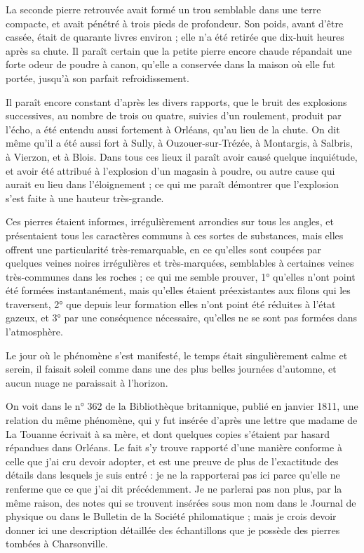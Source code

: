 \documentclass[a4paper, 12pt, oneside, french]{article}
\begin{document}
La seconde pierre retrouvée avait formé un trou semblable dans une terre compacte, et avait pénétré à trois pieds de profondeur. Son poids, avant d'être cassée, était de quarante livres environ ; elle n'a été retirée que dix-huit heures après sa chute. Il paraît certain que la petite pierre encore chaude répandait une forte odeur de poudre à canon, qu'elle a conservée dans la maison où elle fut portée, jusqu'à son parfait refroidissement.

Il paraît encore constant d'après les divers rapports, que le bruit des explosions successives, au nombre de trois ou quatre, suivies d'un roulement, produit par l'écho, a été entendu aussi fortement à Orléans, qu'au lieu de la chute. On dit même qu'il a été aussi fort à Sully, à Ouzouer-sur-Trézée, à Montargis, à Salbris, à Vierzon, et à Blois. Dans tous ces lieux il paraît avoir causé quelque inquiétude, et avoir été attribué à l'explosion d'un magasin à poudre, ou autre cause qui aurait eu lieu dans l'éloignement ; ce qui me paraît démontrer que l'explosion s'est faite à une hauteur très-grande.

Ces pierres étaient informes, irrégulièrement arrondies sur tous les angles, et présentaient tous les caractères communs à ces sortes de substances, mais elles offrent une particularité très-remarquable, en ce qu'elles sont coupées par quelques veines noires irrégulières et très-marquées, semblables à certaines veines très-communes dans les roches ; ce qui me semble prouver, 1° qu'elles n'ont point été formées instantanément, mais qu'elles étaient préexistantes aux filons qui les traversent, 2° que depuis leur formation elles n'ont point été réduites à l'état gazeux, et 3° par une conséquence nécessaire, qu'elles ne se sont pas formées dans l'atmosphère.

Le jour où le phénomène s'est manifesté, le temps était singulièrement calme et serein, il faisait soleil comme dans une des plus belles journées d'automne, et aucun nuage ne paraissait à l'horizon.

On voit dans le n° 362 de la Bibliothèque britannique, publié en janvier 1811, une relation du même phénomène, qui y fut insérée d'après une lettre que madame de La Touanne écrivait à sa mère, et dont quelques copies s'étaient par hasard répandues dans Orléans. Le fait s'y trouve rapporté d'une manière conforme à celle que j'ai cru devoir adopter, et est une preuve de plus de l'exactitude des détails dans lesquels je suis entré : je ne la rapporterai pas ici parce qu'elle ne renferme que ce que j'ai dit précédemment. Je ne parlerai pas non plus, par la même raison, des notes qui se trouvent insérées sous mon nom dans le Journal de physique ou dans le Bulletin de la Société philomatique ; mais je crois devoir donner ici une description détaillée des échantillons que je possède des pierres tombées à Charsonville.
\end{document}
